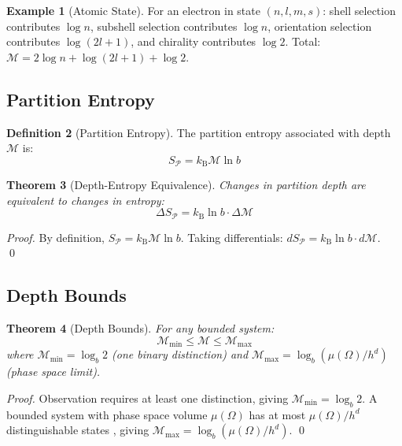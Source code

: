 \documentclass[twocolumn,10pt,a4paper]{article}
\newtheorem{theorem}{Theorem}[section]
\theoremstyle{definition}
\newtheorem{definition}[theorem]{Definition}
\newtheorem{example}[theorem]{Example}
\theoremstyle{remark}
\newcommand{\kB}{k_{\mathrm{B}}}
\newcommand{\Depth}{\mathcal{M}}
\newcommand{\Partition}{\mathcal{P}}
\begin{document}
\begin{example}[Atomic State]
For an electron in state $(n, l, m, s)$: shell selection contributes $\log n$, subshell selection contributes $\log n$, orientation selection contributes $\log(2l+1)$, and chirality contributes $\log 2$. Total: $\Depth = 2\log n + \log(2l+1) + \log 2$.
\end{example}

\subsection{Partition Entropy}

\begin{definition}[Partition Entropy]
The partition entropy associated with depth $\Depth$ is:
\begin{equation}
    S_{\Partition} = \kB \Depth \ln b
\end{equation}
\end{definition}

\begin{theorem}[Depth-Entropy Equivalence]
\label{thm:entropy-equiv}
Changes in partition depth are equivalent to changes in entropy:
\begin{equation}
    \Delta S_{\Partition} = \kB \ln b \cdot \Delta\Depth
\end{equation}
\end{theorem}

\begin{proof}
By definition, $S_{\Partition} = \kB \Depth \ln b$. Taking differentials: $dS_{\Partition} = \kB \ln b \cdot d\Depth$. \qed
\end{proof}

\subsection{Depth Bounds}

\begin{theorem}[Depth Bounds]
\label{thm:bounds}
For any bounded system:
\begin{equation}
    \Depth_{\min} \leq \Depth \leq \Depth_{\max}
\end{equation}
where $\Depth_{\min} = \log_b 2$ (one binary distinction) and $\Depth_{\max} = \log_b(\mu(\Omega)/h^d)$ (phase space limit).
\end{theorem}

\begin{proof}
Observation requires at least one distinction, giving $\Depth_{\min} = \log_b 2$. A bounded system with phase space volume $\mu(\Omega)$ has at most $\mu(\Omega)/h^d$ distinguishable states \citep{landau1980}, giving $\Depth_{\max} = \log_b(\mu(\Omega)/h^d)$. \qed
\end{proof}
\end{document}
